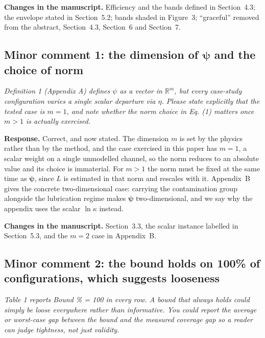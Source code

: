 \documentclass[11pt,a4paper]{article}
\newenvironment{comment}
  {\begin{list}{}{\leftmargin=6mm \rightmargin=2mm}\item[]\color{quoteline}\itshape}
  {\end{list}}
\newcommand{\where}[1]{\textbf{Changes in the manuscript.} #1}
\begin{document}
\where{Efficiency and the bands defined in Section~4.3; the envelope stated in Section~5.2; bands
shaded in Figure~3; ``graceful'' removed from the abstract, Section~4.3, Section~6 and Section~7.}

\subsection*{Minor comment 1: the dimension of $\boldsymbol\psi$ and the choice of norm}
\begin{comment}
Definition 1 (Appendix A) defines $\psi$ as a vector in $\mathbb{R}^m$, but every case-study
configuration varies a single scalar departure via $\eta$. Please state explicitly that the tested
case is $m = 1$, and note whether the norm choice in Eq. (1) matters once $m > 1$ is actually
exercised.
\end{comment}

\noindent\textbf{Response.} Correct, and now stated. The dimension $m$ is set by the physics rather
than by the method, and the case exercised in this paper has $m=1$, a scalar weight on a single
unmodelled channel, so the norm reduces to an absolute value and its choice is immaterial. For
$m>1$ the norm must be fixed at the same time as $\boldsymbol\psi$, since $L$ is estimated in that
norm and rescales with it. Appendix~B gives the concrete two-dimensional case: carrying the
contamination group alongside the lubrication regime makes $\boldsymbol\psi$ two-dimensional, and we
say why the appendix uses the scalar $\ln\kappa$ instead.

\where{Section~3.3, the scalar instance labelled in Section~5.3, and the $m=2$ case in Appendix~B.}

\subsection*{Minor comment 2: the bound holds on 100\% of configurations, which suggests looseness}
\begin{comment}
Table 1 reports Bound \% = 100 in every row. A bound that always holds could simply be loose
everywhere rather than informative. You could report the average or worst-case gap between the
bound and the measured coverage gap so a reader can judge tightness, not just validity.
\end{comment}
\end{document}
